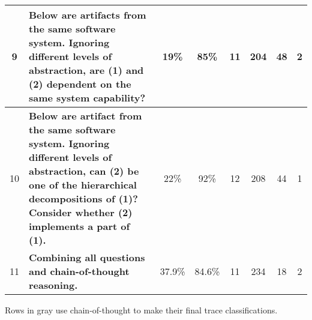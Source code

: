 \begin{table*}
\begin{tabular}{cp{11cm}|cccccc}
9 & \textbf{Below are artifacts from the same software system. Ignoring different levels of abstraction, are (1) and (2) dependent on the same system capability?} & 19\% & 85\% & 11 & 204 & 48 & 2 \\
\midrule

10 & \textbf{Below are artifact from the same software system. Ignoring different levels of abstraction, can (2) be one of the hierarchical decompositions of (1)? Consider whether (2) implements a part of (1).} & 22\% & 92\% & 12 & 208 & 44 & 1 \\
\midrule

11 & \textbf{Combining all questions and chain-of-thought reasoning.} & \cellcolor{gray!20}37.9\% & \cellcolor{gray!20}84.6\% & \cellcolor{gray!20}11 & \cellcolor{gray!20}234 & \cellcolor{gray!20}18 & \cellcolor{gray!20}2 \\
\bottomrule
\end{tabular}
{\newline \newline \raggedright Rows in gray use chain-of-thought to make their final trace classifications.}
\vspace{-12pt}
\end{table*}
